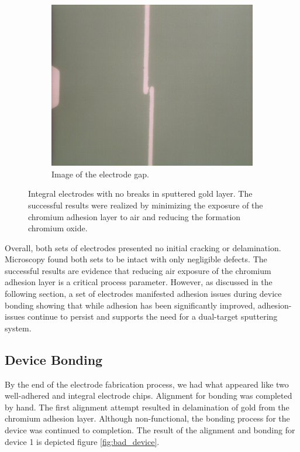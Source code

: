 \begin{figure}[h]
\begin{subfigure}[b]{0.45\textwidth}
        \includegraphics[width=\textwidth]{images/goodElectrodeCloseUp.png}
        \caption{Image of the electrode gap.}
    \end{subfigure}
    \caption{Integral electrodes with no breaks in sputtered gold layer. The successful results were realized by minimizing the exposure of the chromium adhesion layer to air and reducing the formation chromium oxide.}
    \label{fig:good_electrodes}
\end{figure}

\FloatBarrier

\par Overall, both sets of electrodes presented no initial cracking or delamination. Microscopy found both sets to be intact with only negligible defects. The successful results are evidence that reducing air exposure of the chromium adhesion layer is a critical process parameter. However, as discussed in the following section, a set of electrodes manifested adhesion issues during device bonding showing that while adhesion has been significantly improved, adhesion-issues continue to persist and supports the need for a dual-target sputtering system.

\FloatBarrier

\subsection{Device Bonding}

\par By the end of the electrode fabrication process, we had what appeared like two well-adhered and integral electrode chips. Alignment for bonding was completed by hand. The first alignment attempt resulted in delamination of gold from the chromium adhesion layer. Although non-functional, the bonding process for the device was continued to completion. The result of the alignment and bonding for device 1 is depicted figure \ref{fig:bad_device}.

